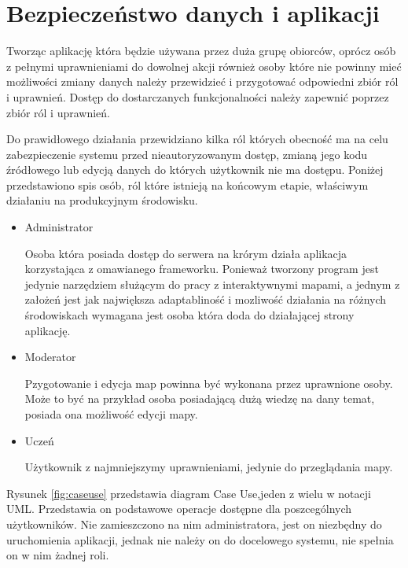 \section{Bezpieczeństwo danych i aplikacji}
\label{sec:bezpieczenstwo}

Tworząc aplikację która będzie używana przez duża grupę obiorców, oprócz osób z pełnymi uprawnieniami do dowolnej akcji również osoby które nie powinny mieć możliwości zmiany danych należy przewidzieć i przygotować odpowiedni zbiór ról i uprawnień. Dostęp do dostarczanych funkcjonalności należy zapewnić poprzez zbiór ról i uprawnień.

Do prawidłowego działania przewidziano kilka ról których obecność ma na celu zabezpieczenie systemu przed nieautoryzowanym dostęp, zmianą jego kodu źródłowego lub edycją danych do których użytkownik nie ma dostępu. Poniżej przedstawiono spis osób, ról które istnieją na końcowym etapie, właściwym działaniu na produkcyjnym środowisku.

\begin{itemize}
\item
Administrator

Osoba która posiada dostęp do serwera na krórym działa aplikacja korzystająca z omawianego frameworku. Ponieważ tworzony program jest jedynie narzędziem służącym do pracy z interaktywnymi mapami, a jednym z założeń jest jak największa adaptabliność i mozliwość działania na różnych środowiskach wymagana jest osoba która doda do działającej strony aplikację.
\item
Moderator

Pzygotowanie i edycja map powinna być wykonana przez uprawnione osoby. Może to być na przykład osoba posiadającą dużą wiedzę na dany temat, posiada ona możliwość edycji mapy.
\item
Uczeń

Użytkownik z najmniejszymy uprawnieniami, jedynie do przeglądania mapy.
\end{itemize}

Rysunek \ref{fig:caseuse} przedstawia diagram Case Use,jeden z wielu w notacji UML. Przedstawia on podstawowe operacje dostępne dla poszcególnych użytkowników. Nie zamieszczono na nim administratora, jest on niezbędny do uruchomienia aplikacji, jednak nie należy on do docelowego systemu, nie spełnia on w nim żadnej roli.

